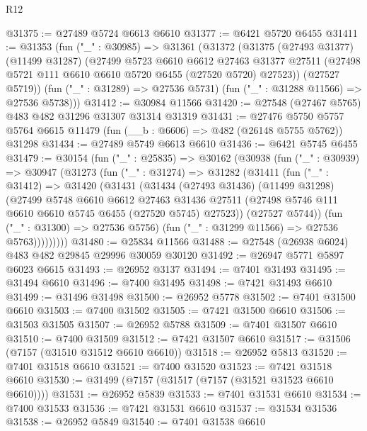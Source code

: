 \begin{lexlean}{R12}
\begin{coremodule}
@31375 := @27489 @5724 @6613 @6610
@31377 := @6421 @5720 @6455
@31411 := @31353
    (fun ("_" : @30985) =>
    @31361
      (@31372
        (@31375
          (@27493 @31377)
          (@11499 @31287)
          (@27499
            @5723
            @6610
            @6612
            @27463
            @31377
            @27511
            (@27498 @5721 @111 @6610 @6610 @5720 @6455 (@27520 @5720) @27523))
          (@27527 @5719))
        (fun ("_" : @31289) => @27536 @5731)
        (fun ("_" : @31288 @11566) => @27536 @5738)))
@31412 := @30984 @11566
@31420 := @27548 (@27467 @5765) @483 @482 @31296 @31307 @31314 @31319
@31431 := @27476
    @5750
    @5757
    @5764
    @6615
    @11479
    (fun (__b : @6606) => @482 (@26148 @5755 @5762))
    @31298
@31434 := @27489 @5749 @6613 @6610
@31436 := @6421 @5745 @6455
@31479 := @30154
    (fun ("_" : @25835) =>
    @30162
      (@30938
        (fun ("_" : @30939) =>
        @30947
          (@31273
            (fun ("_" : @31274) =>
            @31282
              (@31411
                (fun ("_" : @31412) =>
                @31420
                  (@31431
                    (@31434
                      (@27493 @31436)
                      (@11499 @31298)
                      (@27499
                        @5748
                        @6610
                        @6612
                        @27463
                        @31436
                        @27511
                        (@27498 @5746 @111 @6610 @6610 @5745 @6455 (@27520 @5745) @27523))
                      (@27527 @5744))
                    (fun ("_" : @31300) => @27536 @5756)
                    (fun ("_" : @31299 @11566) => @27536 @5763)))))))))
@31480 := @25834 @11566
@31488 := @27548 (@26938 @6024) @483 @482 @29845 @29996 @30059 @30120
@31492 := @26947 @5771 @5897 @6023 @6615
@31493 := @26952 @3137
@31494 := @7401 @31493
@31495 := @31494 @6610
@31496 := @7400 @31495
@31498 := @7421 @31493 @6610
@31499 := @31496 @31498
@31500 := @26952 @5778
@31502 := @7401 @31500 @6610
@31503 := @7400 @31502
@31505 := @7421 @31500 @6610
@31506 := @31503 @31505
@31507 := @26952 @5788
@31509 := @7401 @31507 @6610
@31510 := @7400 @31509
@31512 := @7421 @31507 @6610
@31517 := @31506 (@7157 (@31510 @31512 @6610 @6610))
@31518 := @26952 @5813
@31520 := @7401 @31518 @6610
@31521 := @7400 @31520
@31523 := @7421 @31518 @6610
@31530 := @31499 (@7157 (@31517 (@7157 (@31521 @31523 @6610 @6610))))
@31531 := @26952 @5839
@31533 := @7401 @31531 @6610
@31534 := @7400 @31533
@31536 := @7421 @31531 @6610
@31537 := @31534 @31536
@31538 := @26952 @5849
@31540 := @7401 @31538 @6610

\end{coremodule}
\end{lexlean}

